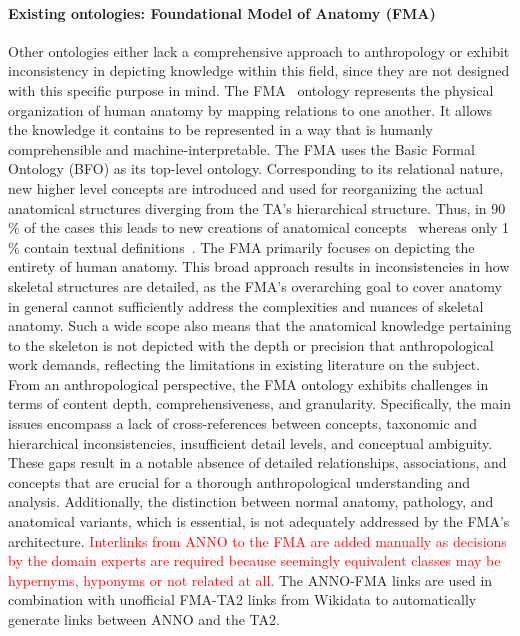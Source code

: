 \documentclass[sw]{iosart2x}
\newcommand{\revision}[1]{\textcolor{red}{#1}}%
\begin{document}
\paragraph{Existing ontologies: Foundational Model of Anatomy (FMA)}\label{sec:OntologiesFMA}
Other ontologies either lack a comprehensive approach to anthropology or exhibit inconsistency in depicting knowledge within this field, since they are not designed with this specific purpose in mind.
The FMA~\citep{fma} ontology represents the physical organization of human anatomy by mapping relations to one another.
It allows the knowledge it contains to be represented in a way that is humanly comprehensible and machine-interpretable.
The FMA uses the Basic Formal Ontology (BFO) as its top-level ontology.
Corresponding to its relational nature, new higher level concepts are introduced and used for reorganizing the actual anatomical structures diverging from the TA's hierarchical structure.
Thus, in 90\,\% of the cases this leads to new creations of anatomical concepts~\citep{anatomicalterms} whereas only 1\,\% contain textual definitions~\citep{uberon}.
The FMA primarily focuses on depicting the entirety of human anatomy.
This broad approach results in inconsistencies in how skeletal structures are detailed, as the FMA's overarching goal to cover anatomy in general cannot sufficiently address the complexities and nuances of skeletal anatomy.
Such a wide scope also means that the anatomical knowledge pertaining to the skeleton is not depicted with the depth or precision that anthropological work demands, reflecting the limitations in existing literature on the subject.
From an anthropological perspective, the FMA ontology exhibits challenges in terms of content depth, comprehensiveness, and granularity.
Specifically, the main issues encompass a lack of cross-references between concepts, taxonomic and hierarchical inconsistencies, insufficient detail levels, and conceptual ambiguity.
These gaps result in a notable absence of detailed relationships, associations, and concepts that are crucial for a thorough anthropological understanding and analysis.
Additionally, the distinction between normal anatomy, pathology, and anatomical variants, which is essential, is not adequately addressed by the FMA's architecture.
%
\revision{%
Interlinks from ANNO to the FMA are added manually as decisions by the domain experts are required because seemingly equivalent classes may be hypernyms, hyponyms or not related at all.
}%
The ANNO-FMA links are used in combination with unofficial FMA-TA2 links from Wikidata to automatically generate links between ANNO and the TA2.
\end{document}
